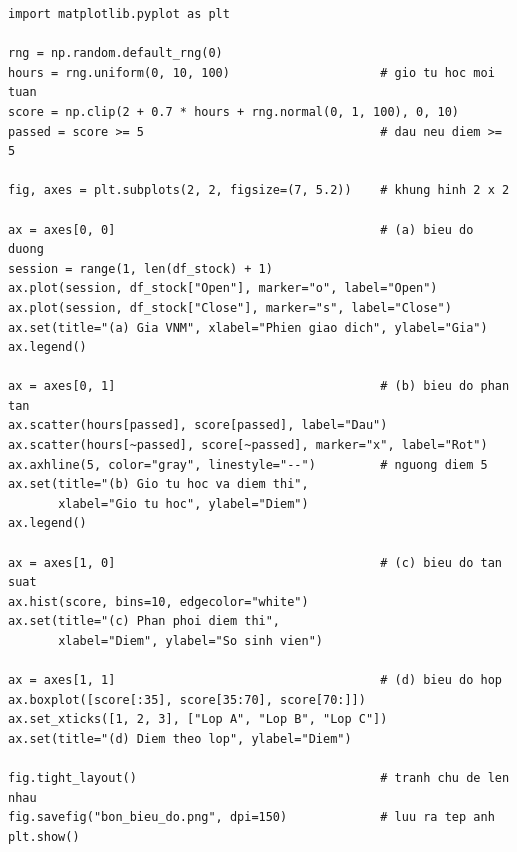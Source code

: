 \begin{lstlisting}[caption={Bốn biểu đồ cơ bản với Matplotlib}]
import matplotlib.pyplot as plt

rng = np.random.default_rng(0)
hours = rng.uniform(0, 10, 100)                     # gio tu hoc moi tuan
score = np.clip(2 + 0.7 * hours + rng.normal(0, 1, 100), 0, 10)
passed = score >= 5                                 # dau neu diem >= 5

fig, axes = plt.subplots(2, 2, figsize=(7, 5.2))    # khung hinh 2 x 2

ax = axes[0, 0]                                     # (a) bieu do duong
session = range(1, len(df_stock) + 1)
ax.plot(session, df_stock["Open"], marker="o", label="Open")
ax.plot(session, df_stock["Close"], marker="s", label="Close")
ax.set(title="(a) Gia VNM", xlabel="Phien giao dich", ylabel="Gia")
ax.legend()

ax = axes[0, 1]                                     # (b) bieu do phan tan
ax.scatter(hours[passed], score[passed], label="Dau")
ax.scatter(hours[~passed], score[~passed], marker="x", label="Rot")
ax.axhline(5, color="gray", linestyle="--")         # nguong diem 5
ax.set(title="(b) Gio tu hoc va diem thi",
       xlabel="Gio tu hoc", ylabel="Diem")
ax.legend()

ax = axes[1, 0]                                     # (c) bieu do tan suat
ax.hist(score, bins=10, edgecolor="white")
ax.set(title="(c) Phan phoi diem thi",
       xlabel="Diem", ylabel="So sinh vien")

ax = axes[1, 1]                                     # (d) bieu do hop
ax.boxplot([score[:35], score[35:70], score[70:]])
ax.set_xticks([1, 2, 3], ["Lop A", "Lop B", "Lop C"])
ax.set(title="(d) Diem theo lop", ylabel="Diem")

fig.tight_layout()                                  # tranh chu de len nhau
fig.savefig("bon_bieu_do.png", dpi=150)             # luu ra tep anh
plt.show()
\end{lstlisting}


